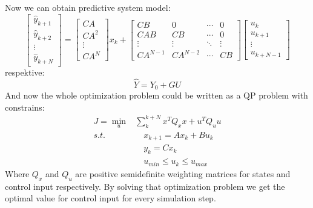 Now we can obtain predictive system model:
\begin{equation}
	\begin{bmatrix}
	\hat{y}_{k+1}\\\hat{y}_{k+2}\\ \vdots\\ \hat{y}_{k+N}
	\end{bmatrix} = \begin{bmatrix}CA\\CA^2\\ \vdots \\ CA^N\end{bmatrix}x_k + \begin{bmatrix}CB& 0&\cdots&0\\
	CAB&CB&\cdots&0\\
	\vdots&\vdots&\ddots&\vdots\\
	CA^{N-1}&CA^{N-2}&\cdots&CB\end{bmatrix}\begin{bmatrix}u_k\\u_{k+1}\\\vdots\\u_{k+N-1}\end{bmatrix}
\end{equation}
respektive:
\begin{equation}
	\hat{Y} = Y_0 + GU
\end{equation}
And now the whole optimization problem could be written as a QP problem with constrains:
\begin{equation}
\begin{split}
J = \min_{u}& \sum_{k}^{k+N}x^TQ_xx+u^TQ_uu\\
s.t.&\quad  x_{k+1} = Ax_k + Bu_k\\
&\quad  y_{k} = Cx_k\\
& \quad u_{min}\leq u_k\leq u_{max}
\end{split}
\end{equation}
Where $Q_x$ and $Q_u$ are positive semidefinite weighting matrices for states and control input respectively.
By solving that optimization problem we get the optimal value for control input for every simulation step.
